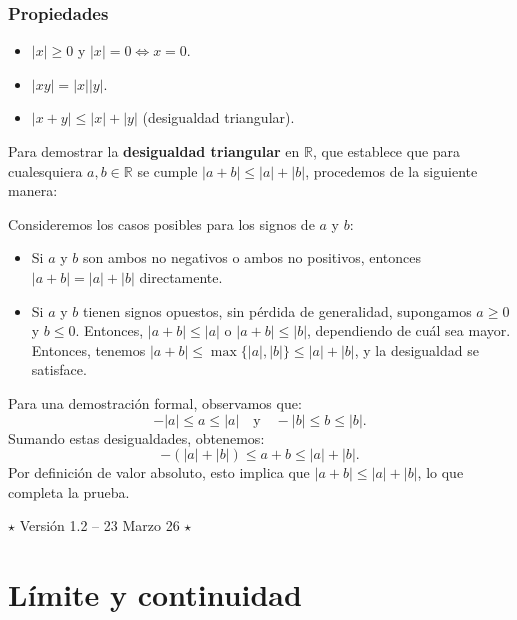 \documentclass[12pt, a4paper]{article}
\theoremstyle{rioplatense}
\begin{document}
\subsubsection{Propiedades}
\begin{itemize}
    \item \( |x| \geq 0 \) y \( |x| = 0 \iff x = 0 \).
    \item \( |xy| = |x||y| \).
    \item \( |x + y| \leq |x| + |y| \) (desigualdad triangular).
\end{itemize}

Para demostrar la \textbf{desigualdad triangular} en \(\mathbb{R}\), que establece que para cualesquiera \(a, b \in \mathbb{R}\) se cumple \(|a + b| \leq |a| + |b|\), procedemos de la siguiente manera:

Consideremos los casos posibles para los signos de \(a\) y \(b\):
\begin{itemize}
    \item Si \(a\) y \(b\) son ambos no negativos o ambos no positivos, entonces \(|a + b| = |a| + |b|\) directamente.
    \item Si \(a\) y \(b\) tienen signos opuestos, sin pérdida de generalidad, supongamos \(a \geq 0\) y \(b \leq 0\). Entonces, \(|a + b| \leq |a|\) o \(|a + b| \leq |b|\), dependiendo de cuál sea mayor. Entonces, tenemos \(|a + b| \leq \max\{|a|, |b|\} \leq |a| + |b|\), y la desigualdad se satisface.
\end{itemize}

Para una demostración formal, observamos que:
\[
-|a| \leq a \leq |a| \quad \text{y} \quad -|b| \leq b \leq |b|.
\]
Sumando estas desigualdades, obtenemos:
\[
-(|a| + |b|) \leq a + b \leq |a| + |b|.
\]
Por definición de valor absoluto, esto implica que \(|a + b| \leq |a| + |b|\), lo que completa la prueba.

\begin{center}
$\star$
Versión 1.2 -- 23 Marzo 26
$\star$
\end{center}

\newpage

\section{Límite y continuidad}

\end{document}
